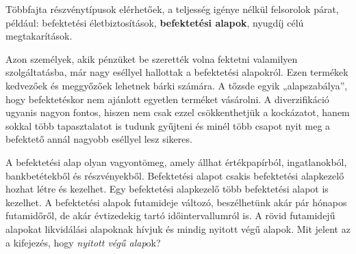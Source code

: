 	Többfajta részvénytípusok elérhetőek, a teljesség igénye nélkül felsorolok párat, például: befektetési életbiztosítások, \textbf{befektetési alapok}, nyugdíj célú megtakarítások.  \cite{wikiShare}


Azon személyek, akik pénzüket be szerették volna fektetni valamilyen szolgáltatásba, már nagy eséllyel hallottak a befektetési alapokról. Ezen termékek kedvezőek és meggyőzőek lehetnek bárki számára. A tőzsde egyik „alapszabálya”, hogy befektetéskor nem ajánlott egyetlen terméket vásárolni. A diverzifikáció ugyanis nagyon fontos, hiszen nem csak ezzel csökkenthetjük a kockázatot, hanem sokkal több tapasztalatot is tudunk gyűjteni és minél több csapot nyit meg a befektető annál nagyobb eséllyel lesz sikeres. \cite{OTPInvest}

	A befektetési alap olyan vagyontömeg, amely állhat értékpapírból, ingatlanokból, bankbetétekből és részvényekből. Befektetési alapot csakis befektetési alapkezelő hozhat létre és kezelhet. Egy befektetési alapkezelő több befektetési alapot is kezelhet. A befektetési alapok futamideje változó, beszélhetünk akár pár hónapos futamidőről, de akár évtizedekig tartó időintervallumról is. A rövid futamidejű alapokat likvidálási alapoknak hívjuk és mindig nyitott végű alapok. Mit jelent az a kifejezés, hogy \emph{nyitott végű alap}ok? 

